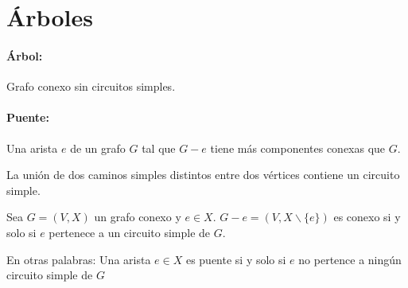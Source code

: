 \newpage
\section{{Árboles}}
\paragraph{Árbol:} Grafo conexo sin circuitos simples.

\paragraph{Puente:} Una arista \(e\) de un grafo \(G\) tal que \(G - e\) tiene más componentes conexas que \(G\).

\begin{lema}
	La unión de dos caminos simples distintos entre dos vértices contiene un circuito simple.
\end{lema}

\begin{lema}
	Sea \(G =(V, X)\) un grafo conexo y \(e\in X\). \(G-e = (V, X\backslash\{e\})\) es conexo si y solo si \(e\) pertenece a un circuito simple de \(G\).
	
	En otras palabras: Una arista \(e\in X\) es puente si y solo si \(e\) no pertence a ningún circuito simple de \(G\)
\end{lema}

